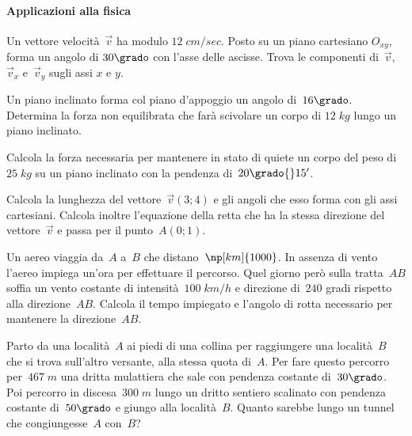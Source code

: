 \paragraph{Applicazioni alla fisica}
\begin{multicols}{2}
\begin{esercizio}
\label{ese:G.37}
Un vettore velocità~$\vec{v}$ ha modulo $12\;\unit{cm/sec}$. Posto su un piano cartesiano $O_{xy}$, forma un angolo di $30\grado$ con
l'asse delle ascisse. Trova le componenti di~$\vec{v}$, $\vec{v}_x$ e~$\vec{v}_y$ sugli assi $x$ e $y$.
\end{esercizio}

\begin{esercizio}
\label{ese:G.38}
Un piano inclinato forma col piano d'appoggio un angolo di~$16\grado$. Determina la forza non equilibrata che farà scivolare un corpo di
$12\;\unit{kg}$ lungo un piano inclinato.
\end{esercizio}

\begin{esercizio}
\label{ese:G.39}
Calcola la forza necessaria per mantenere in stato di quiete un corpo del peso di~$25\;\unit{kg}$ su un piano inclinato con
la pendenza di~$20\grado{}15'$.
\end{esercizio}

\begin{esercizio}
\label{ese:G.40}
Calcola la lunghezza del vettore~$\vec{v}(3;4)$ e gli angoli che esso forma con gli assi cartesiani.
Calcola inoltre l'equazione della retta che ha la stessa direzione del vettore~$\vec{v}$ e passa per il punto~$A(0;1)$.
\end{esercizio}

\begin{esercizio}
\label{ese:G.41}
Un aereo viaggia da~$A$ a~$B$ che distano~$\np[km]{1000}$. In assenza di vento l'aereo impiega un'ora per effettuare il percorso.
Quel giorno però sulla tratta~$AB$ soffia un vento costante di intensità~$100\;\unit{km/h}$ e direzione di~$240$ gradi
rispetto alla direzione~$AB$. Calcola il tempo impiegato e l'angolo di rotta necessario per mantenere la direzione~$AB$.
\end{esercizio}


\begin{esercizio}[\Ast]
\label{ese:G.42}
Parto da una località~$A$ ai piedi di una collina per raggiungere una località~$B$ che si trova sull'altro versante,
alla stessa quota di~$A$. Per fare questo percorro per~$467\;\unit{m}$ una dritta mulattiera che sale con pendenza costante di~$30\grado$.
Poi percorro in discesa~$300\;\unit{m}$ lungo un dritto sentiero scalinato con pendenza costante di~$50\grado$ e giungo alla località~$B$.
Quanto sarebbe lungo un tunnel che congiungesse~$A$ con~$B$?
\begin{center}
 
\end{center}
\end{esercizio}


\end{multicols}

